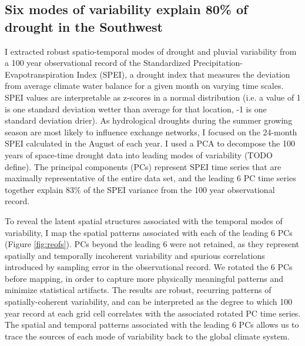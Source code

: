 \documentclass[11pt]{wlscirep}
\begin{document}
\subsection*{Six modes of variability explain 80\% of drought in the Southwest}
I extracted robust spatio-temporal modes of drought and pluvial variability from a 100 year observational record of the Standardized Precipitation-Evapotranspiration Index (SPEI), a drought index that measures the deviation from average climate water balance for a given month on varying time scales. SPEI values are interpretable as z-scores in a normal distribution (i.e. a value of 1 is one standard deviation wetter than average for that location, -1 is one standard deviation drier). As hydrological droughts during the summer growing season are most likely to influence exchange networks, I focused on the 24-month SPEI calculated in the August of each year. I used a PCA to decompose the 100 years of space-time drought data into leading modes of variability (TODO define). The principal components (PCs) represent SPEI time series that are maximally representative of the entire data set, and the leading 6 PC time series together explain 83\% of the SPEI variance from the 100 year observational record. 

To reveal the latent spatial structures associated with the temporal modes of variability, I map the spatial patterns associated with each of the leading 6 PCs (Figure \ref{fig:reofs}). PCs beyond the leading 6 were not retained, as they represent spatially and temporally incoherent variability and spurious correlations introduced by sampling error in the observational record. We rotated the 6 PCs before mapping, in order to capture more physically meaningful patterns and minimize statistical artifacts. The results are robust, recurring patterns of spatially-coherent variability, and can be interpreted as the degree to which 100 year record at each grid cell correlates with the associated rotated PC time series. The spatial and temporal patterns associated with the leading 6 PCs allows us to trace the sources of each mode of variability back to the global climate system.

\end{document}

